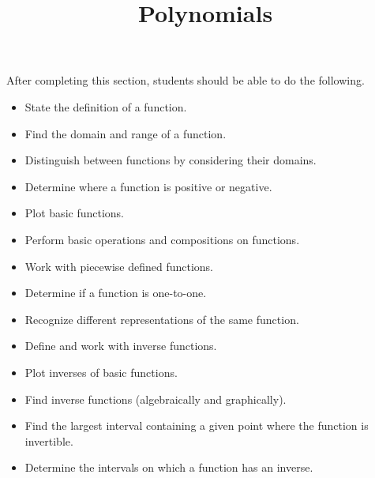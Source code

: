 \documentclass{ximera}
\title{Polynomials}
\begin{document}
\begin{abstract} 
\end{abstract}

\maketitle

\begin{sectionOutcomes}
After completing this section, students should be able to do the following.

\begin{itemize}
	\item State the definition of a function.
	\item Find the domain and range of a function.
	\item Distinguish between functions by considering their domains.
	\item Determine where a function is positive or negative.
	\item Plot basic functions.
        \item Perform basic operations and compositions on
          functions.
        \item Work with piecewise defined functions.
	\item Determine if a function is one-to-one.
	\item Recognize different representations of the same function.
        \item Define and work with inverse functions.
        \item Plot inverses of basic functions.
	\item Find inverse functions (algebraically and graphically).
        \item Find the largest interval containing a given point
          where the function is invertible.
	\item Determine the intervals on which a function has an inverse.

\end{itemize}
\end{sectionOutcomes}
\end{document}

